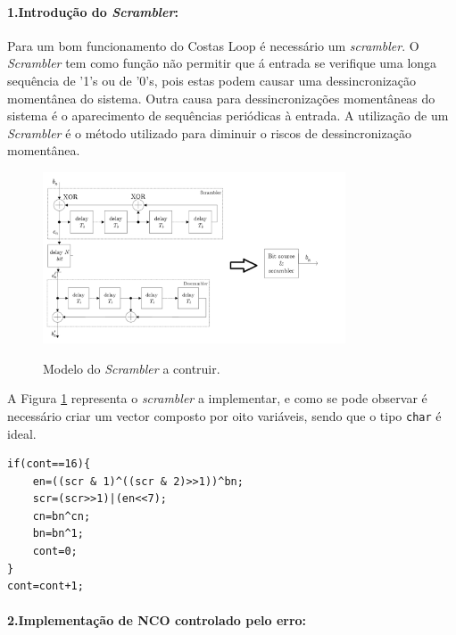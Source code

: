 \documentclass[11pt]{article}
\numberwithin{equation}{section}
\begin{document}
\paragraph{1.Introdução do \textit{Scrambler}:} \hspace{0pt}
\label{para:P3-1}


Para um bom funcionamento do Costas Loop é necessário um \textit{scrambler}. O \textit{Scrambler} tem como função não permitir que á entrada se verifique uma longa sequência de '1's ou de '0's, pois estas podem causar uma dessincronização momentânea do sistema. Outra causa para dessincronizações momentâneas do sistema é o aparecimento de sequências periódicas à entrada. A utilização de um \textit{Scrambler} é o  método utilizado para diminuir o riscos de dessincronização momentânea.
\begin{figure}[H]
	\centering
	\includegraphics[width=0.8\textwidth]{./Scrambler}~\\
	\caption{Modelo do \textit{Scrambler} a contruir.}
	\label{fig:scrambler}
\end{figure}

A Figura \ref{fig:scrambler} representa o \textit{scrambler} a implementar, e como se pode observar é necessário criar um vector composto por oito variáveis, sendo que o tipo \texttt{char} é ideal.
\begin{lstlisting}
if(cont==16){
	en=((scr & 1)^((scr & 2)>>1))^bn;
	scr=(scr>>1)|(en<<7);
	cn=bn^cn;
	bn=bn^1;
	cont=0;
}
cont=cont+1;
\end{lstlisting}


\paragraph{2.Implementação de NCO controlado pelo erro:} \hspace{0pt} \label{para:P3-2}
\end{document}
